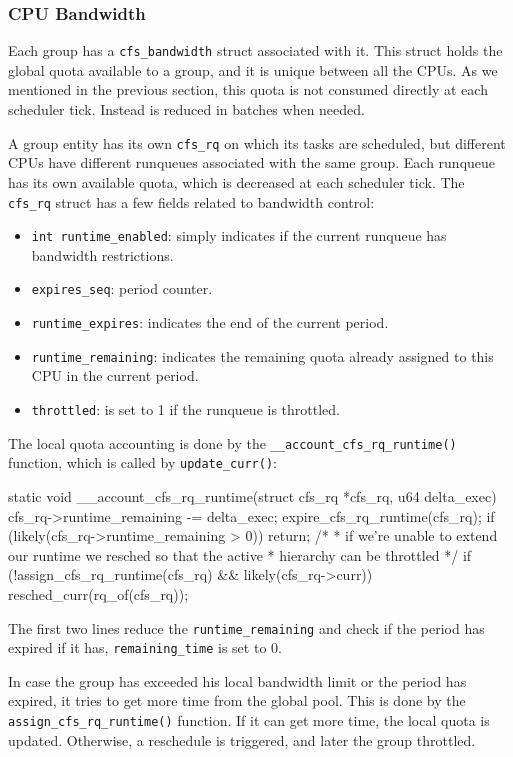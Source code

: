 \subsubsection{CPU Bandwidth}
Each group has a \verb|cfs_bandwidth| struct associated with it. This struct holds the global quota available to a group, and it is unique between all the CPUs. As we mentioned in the previous section, this quota is not consumed directly at each scheduler tick. Instead is reduced in batches when needed.

A group entity has its own \verb|cfs_rq| on which its tasks are scheduled, but different CPUs have different runqueues associated with the same group. Each runqueue has its own available quota, which is decreased at each scheduler tick. The \verb|cfs_rq| struct has a few fields related to bandwidth control:
\begin{itemize}
    \item \verb|int runtime_enabled|: simply indicates if the current runqueue has bandwidth restrictions.
    \item \verb|expires_seq|: period counter.
    \item \verb|runtime_expires|: indicates the end of the current period.
    \item \verb|runtime_remaining|: indicates the remaining quota already assigned to this CPU in the current period.
    \item \verb|throttled|: is set to 1 if the runqueue is throttled.
\end{itemize}

The local quota accounting is done by the \verb|__account_cfs_rq_runtime()| function, which is called by \verb|update_curr()|:
\begin{code}
static void __account_cfs_rq_runtime(struct cfs_rq *cfs_rq, u64 delta_exec)
{
	cfs_rq->runtime_remaining -= delta_exec;
	expire_cfs_rq_runtime(cfs_rq);
	if (likely(cfs_rq->runtime_remaining > 0))
		return;
	/*
	 * if we're unable to extend our runtime we resched so that the active
	 * hierarchy can be throttled
	 */
	if (!assign_cfs_rq_runtime(cfs_rq) && likely(cfs_rq->curr))
		resched_curr(rq_of(cfs_rq));
}
\end{code}

The first two lines reduce the \verb|runtime_remaining| and check if the period has expired if it has, \verb|remaining_time| is set to 0.

In case the group has exceeded his local bandwidth limit or the period has expired, it tries to get more time from the global pool. This is done by the \verb|assign_cfs_rq_runtime()| function. If it can get more time, the local quota is updated. Otherwise, a reschedule is triggered, and later the group throttled.

